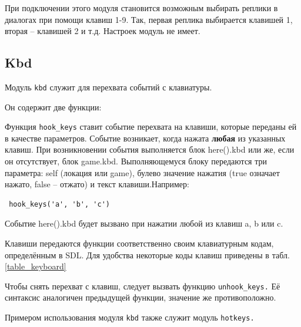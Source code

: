 \documentclass[12pt]{article}
\begin{document}
При подключении этого модуля становится возможным выбирать реплики в диалогах при помощи клавиш 1-9. Так, первая реплика выбирается клавишей 1, вторая -- клавишей 2 и т.д. Настроек модуль не имеет.

\subsection{Kbd}
Модуль \verb/kbd/ служит для перехвата событий с клавиатуры.

Он содержит две функции:

Функция \verb/hook_keys/ ставит событие перехвата на клавиши, которые переданы ей в качестве параметров. Событие возникает, когда нажата \textbf{любая} из указанных клавиш. При возникновении события выполняется блок here().kbd или же, если он отсутствует, блок game.kbd. Выполняющемуся блоку передаются три параметра: self (локация или game), булево значение нажатия (true означает нажато, false -- отжато) и текст клавиши.Например:

\begin{verbatim}
 hook_keys('a', 'b', 'c')
\end{verbatim}

Событие here().kbd будет вызвано при нажатии любой из клавиш a, b или c.

Клавиши передаются функции соответственно своим клавиатурным кодам, определённым в SDL. Для удобства некоторые коды клавиш приведены в табл. \ref{table_keyboard}

Чтобы снять перехват с клавиш, следует вызвать функцию \verb/unhook_keys./ Её синтаксис аналогичен предыдущей функции, значение же противоположно.

Примером использования модуля \verb/kbd/ также служит модуль \verb/hotkeys./

\newcommand{\tabKeyboard}[4]{
\texttt{#1} & #2 & \texttt{#3} & #4 \\
}

\newcommand{\tabKbd}[2]{
\texttt{#1} & #2 & & \\
}
\end{document}
